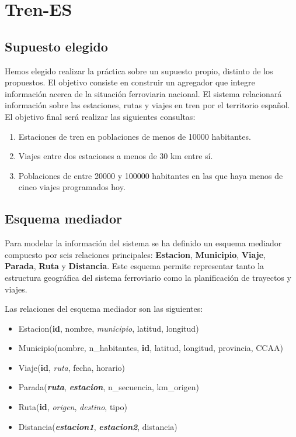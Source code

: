 \section{Tren-ES}\label{tren-es}

\subsection{Supuesto elegido}\label{supuesto-elegido}

Hemos elegido realizar la práctica sobre un supuesto propio, distinto de
los propuestos. El objetivo consiste en construir un agregador que
integre información acerca de la situación ferroviaria nacional. El
sistema relacionará información sobre las estaciones, rutas y viajes en
tren por el territorio español. El objetivo final será realizar las
siguientes consultas:

\begin{enumerate}
\def\labelenumi{\arabic{enumi}.}
\tightlist
\item
  Estaciones de tren en poblaciones de menos de 10000 habitantes.
\item
  Viajes entre dos estaciones a menos de 30 km entre sí.
\item
  Poblaciones de entre 20000 y 100000 habitantes en las que haya menos
  de cinco viajes programados hoy.
\end{enumerate}

\subsection{Esquema mediador}\label{esquema-mediador}

Para modelar la información del sistema se ha definido un esquema
mediador compuesto por seis relaciones principales: \textbf{Estacion},
\textbf{Municipio}, \textbf{Viaje}, \textbf{Parada}, \textbf{Ruta} y
\textbf{Distancia}. Este esquema permite representar tanto la estructura
geográfica del sistema ferroviario como la planificación de trayectos y
viajes.

Las relaciones del esquema mediador son las siguientes:

\begin{itemize}
\tightlist
\item
  Estacion(\textbf{id}, nombre, \emph{municipio}, latitud, longitud)
\item
  Municipio(nombre, n\_habitantes, \textbf{id}, latitud, longitud,
  provincia, CCAA)
\item
  Viaje(\textbf{id}, \emph{ruta}, fecha, horario)
\item
  Parada(\textbf{\emph{ruta}}, \textbf{\emph{estacion}}, n\_secuencia,
  km\_origen)
\item
  Ruta(\textbf{id}, \emph{origen}, \emph{destino}, tipo)
\item
  Distancia(\textbf{\emph{estacion1}}, \textbf{\emph{estacion2}},
  distancia)
\end{itemize}

